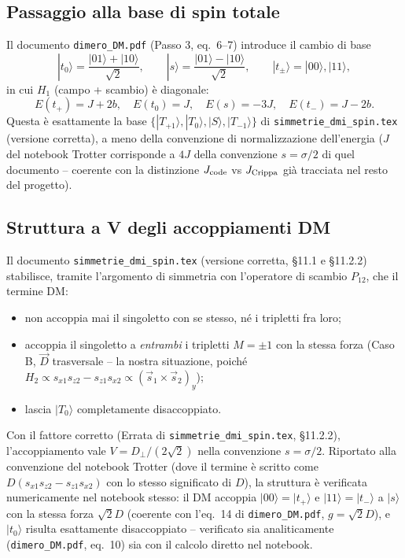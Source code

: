 \documentclass[11pt,a4paper]{article}
\begin{document}
\subsection{Passaggio alla base di spin totale}

Il documento \texttt{dimero\_DM.pdf} (Passo 3, eq.~6--7) introduce il cambio
di base
$$|t_0\rangle=\frac{|01\rangle+|10\rangle}{\sqrt2}, \qquad |s\rangle=\frac{|01\rangle-|10\rangle}{\sqrt2}, \qquad |t_\pm\rangle=|00\rangle,|11\rangle,$$
in cui $H_1$ (campo + scambio) è diagonale:
$$E(t_+)=J+2b,\quad E(t_0)=J,\quad E(s)=-3J,\quad E(t_-)=J-2b.$$
Questa è esattamente la base $\{|T_{+1}\rangle,|T_0\rangle,|S\rangle,|T_{-1}\rangle\}$
di \texttt{simmetrie\_dmi\_spin.tex} (versione corretta), a meno della
convenzione di normalizzazione dell'energia ($J$ del notebook Trotter
corrisponde a $4J$ della convenzione $s=\sigma/2$ di quel documento --
coerente con la distinzione $J_{\rm code}$ vs $J_{\rm Crippa}$ già tracciata
nel resto del progetto).

\subsection{Struttura a V degli accoppiamenti DM}

Il documento \texttt{simmetrie\_dmi\_spin.tex} (versione corretta, \S11.1 e
\S11.2.2) stabilisce, tramite l'argomento di simmetria con l'operatore di
scambio $P_{12}$, che il termine DM:
\begin{itemize}
\item non accoppia mai il singoletto con se stesso, né i tripletti fra loro;
\item accoppia il singoletto a \emph{entrambi} i tripletti $M=\pm1$ con la
stessa forza (Caso B, $\vec D$ trasversale -- la nostra situazione, poiché
$H_2\propto s_{x1}s_{z2}-s_{z1}s_{x2}\propto(\vec s_1\times\vec s_2)_y$);
\item lascia $|T_0\rangle$ completamente disaccoppiato.
\end{itemize}
Con il fattore corretto (Errata di \texttt{simmetrie\_dmi\_spin.tex},
\S11.2.2), l'accoppiamento vale $V=D_\perp/(2\sqrt2)$ nella convenzione
$s=\sigma/2$. Riportato alla convenzione del notebook Trotter (dove il
termine è scritto come $D(s_{x1}s_{z2}-s_{z1}s_{x2})$ con lo stesso
significato di $D$), la struttura è verificata numericamente nel notebook
stesso: il DM accoppia $|00\rangle=|t_+\rangle$ e $|11\rangle=|t_-\rangle$ a
$|s\rangle$ con la stessa forza $\sqrt2 D$ (coerente con l'eq.~14 di
\texttt{dimero\_DM.pdf}, $g=\sqrt2D$), e $|t_0\rangle$ risulta esattamente
disaccoppiato -- verificato sia analiticamente (\texttt{dimero\_DM.pdf},
eq.~10) sia con il calcolo diretto nel notebook.
\end{document}
